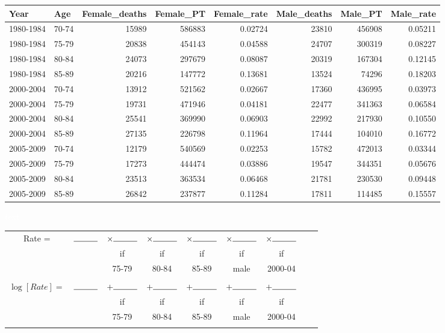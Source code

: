 \documentclass[10pt]{beamer}\usepackage[]{graphicx}\usepackage[]{color}
\newenvironment{knitrout}{}{} %
\begin{document}
\begin{frame}
\begin{knitrout}\tiny
{}\color{fgcolor}
\begin{tabular}{l|l|r|r|r|r|r|r}
\hline
Year & Age & Female\_deaths & Female\_PT & Female\_rate & Male\_deaths & Male\_PT & Male\_rate\\
\hline
1980-1984 & 70-74 & 15989 & 586883 & 0.02724 & 23810 & 456908 & 0.05211\\
\hline
1980-1984 & 75-79 & 20838 & 454143 & 0.04588 & 24707 & 300319 & 0.08227\\
\hline
1980-1984 & 80-84 & 24073 & 297679 & 0.08087 & 20319 & 167304 & 0.12145\\
\hline
1980-1984 & 85-89 & 20216 & 147772 & 0.13681 & 13524 & 74296 & 0.18203\\
\hline
2000-2004 & 70-74 & 13912 & 521562 & 0.02667 & 17360 & 436995 & 0.03973\\
\hline
2000-2004 & 75-79 & 19731 & 471946 & 0.04181 & 22477 & 341363 & 0.06584\\
\hline
2000-2004 & 80-84 & 25541 & 369990 & 0.06903 & 22992 & 217930 & 0.10550\\
\hline
2000-2004 & 85-89 & 27135 & 226798 & 0.11964 & 17444 & 104010 & 0.16772\\
\hline
2005-2009 & 70-74 & 12179 & 540569 & 0.02253 & 15782 & 472013 & 0.03344\\
\hline
2005-2009 & 75-79 & 17273 & 444474 & 0.03886 & 19547 & 344351 & 0.05676\\
\hline
2005-2009 & 80-84 & 23513 & 363534 & 0.06468 & 21781 & 230530 & 0.09448\\
\hline
2005-2009 & 85-89 & 26842 & 237877 & 0.11284 & 17811 & 114485 & 0.15557\\
\hline
\end{tabular}


\end{knitrout}

\textcolor{white}{text}\newline

\begin{tabular}{c c c c c c c c c}
	Rate = & $\rule{1cm}{0.15mm}$ & $\times \rule{1cm}{0.15mm}$ & $\times \rule{1cm}{0.15mm}$ & $\times \rule{1cm}{0.15mm}$ & $\times \rule{1cm}{0.15mm}$ & $\times \rule{1cm}{0.15mm}$ \\
	& &   if  &  if &  if & if & if & \\
	& &  75-79 & 80-84 & 85-89 & male & 2000-04 \\  \\
	$\log[Rate] =$ & $\rule{1cm}{0.15mm}$ & $+ \rule{1cm}{0.15mm}$ & $+ \rule{1cm}{0.15mm}$ & $+ \rule{1cm}{0.15mm}$ & $+ \rule{1cm}{0.15mm}$ & $+ \rule{1cm}{0.15mm}$ \\
	& &   if  &  if &  if & if & if & \\
	& &  75-79 & 80-84 & 85-89 & male & 2000-04 \\ \\
	

\end{tabular}
\end{frame}
\end{document}
